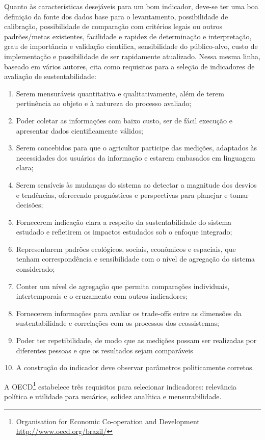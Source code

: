 Quanto às características desejáveis para um bom indicador, deve-se
ter uma boa definição da fonte dos dados base para o levantamento,
possibilidade de calibração, possibilidade de comparação com critérios
legais ou outros padrões/metas existentes, facilidade e rapidez de
determinação e interpretação, grau de importância e validação científica,
sensibilidade do público-alvo, custo de implementação e possibilidade
de ser rapidamente atualizado. Nessa mesma linha, \citet{zampieri2003metodo}
baseado em vários autores, cita como requisitos para a seleção de
indicadores de avaliação de sustentabilidade: \renewcommand{\labelenumi}{\roman{enumi}.}
\begin{enumerate}
\item Serem mensuráveis quantitativa e qualitativamente, além de terem pertinência
ao objeto e à natureza do processo avaliado; 
\item Poder coletar as informações com baixo custo, ser de fácil execução
e apresentar dados cientificamente válidos; 
\item Serem concebidos para que o agricultor participe das medições, adaptados
às necessidades dos usuários da informação e estarem embasados em
linguagem clara; 
\item Serem sensíveis às mudanças do sistema ao detectar a magnitude dos
desvios e tendências, oferecendo prognósticos e perspectivas para
planejar e tomar decisões; 
\item Fornecerem indicação clara a respeito da sustentabilidade do sistema
estudado e refletirem os impactos estudados sob o enfoque integrado; 
\item Representarem padrões ecológicos, sociais, econômicos e espaciais,
que tenham correspondência e sensibilidade com o nível de agregação
do sistema considerado; 
\item Conter um nível de agregação que permita comparações individuais,
intertemporais e o cruzamento com outros indicadores; 
\item Fornecerem informações para avaliar os trade-offs entre as dimensões
da sustentabilidade e correlações com os processos dos ecossistemas; 
\item Poder ter repetibilidade, de modo que as medições possam ser realizadas
por diferentes pessoas e que os resultados sejam comparáveis
\item A construção do indicador deve observar parâmetros politicamente corretos.
\end{enumerate}
A OECD\footnote{Organisation for Economic Co-operation and Development \url{http://www.oecd.org/brazil/}}
estabelece três requisitos para selecionar indicadores: relevância
política e utilidade para usuários, solidez analítica e mensurabilidade. 


